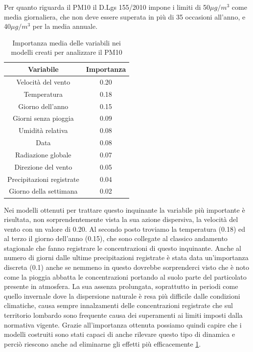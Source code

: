 \documentclass[a4paper]{report}
\begin{document}
Per quanto riguarda il PM10 il D.Lgs 155/2010 impone i limiti di 50$\mu g/m^3$ come media giornaliera, che non deve essere superata in più di 35 occasioni all'anno, e 40$\mu g/m^3$ per la media annuale.

\begin{table}[h!]
\centering
\begin{tabular}{ |c c| }
	\hline
	Variabile & Importanza \\
	\hline
	Velocità del vento & 0.20 \\
	Temperatura & 0.18 \\
	Giorno dell'anno & 0.15 \\
	Giorni senza pioggia & 0.09 \\
	Umidità relativa & 0.08 \\
	Data & 0.08 \\
	Radiazione globale & 0.07 \\
	Direzione del vento & 0.05 \\
	Precipitazioni registrate & 0.04 \\
	Giorno della settimana & 0.02 \\
	\hline
\end{tabular}
\caption{Importanza media delle variabili nei modelli creati per analizzare il PM10}
\label{table:importanza_pm10}
\end{table}

Nei modelli ottenuti per trattare questo inquinante la variabile più importante è risultata, non sorprendentemente vista la sua azione dispersiva, la velocità del vento con un valore di 0.20. Al secondo posto troviamo la temperatura (0.18) ed al terzo il giorno dell'anno (0.15), che sono collegate al classico andamento stagionale che fanno registrare le concentrazioni di questo inquinante. Anche al numero di giorni dalle ultime precipitazioni registrate è stata data un'importanza discreta (0.1) anche se nemmeno in questo dovrebbe sorprenderci visto che è noto come la pioggia abbatta le concentrazioni portando al suolo parte del particolato presente in atmosfera. La sua assenza prolungata, soprattutto in periodi come quello invernale dove la dispersione naturale è resa più difficile dalle condizioni climatiche, causa sempre innalzamenti delle concentrazioni registrate che sul territorio lombardo sono frequente causa dei superamenti ai limiti imposti dalla normativa vigente. Grazie all'importanza ottenuta possiamo quindi capire che i modelli costruiti sono stati capaci di anche rilevare questo tipo di dinamica e perciò riescono anche ad eliminarne gli effetti più efficacemente \ref{table:importanza_pm10}.
\end{document}
